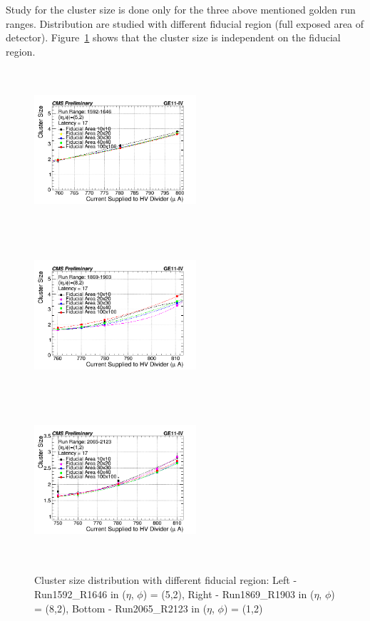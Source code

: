  Study for the cluster size is done only for the three above mentioned golden run ranges. Distribution are studied with different fiducial region (full exposed area of detector). Figure~\ref{fig:CSDfiducialregion} shows that the cluster size is independent on the fiducial region.
  \begin{figure}[!htbp]
    \begin{center}

      \includegraphics[width=6cm,height=6cm]{figures/GEM/CurrentvsClusterSizeR1592R1646.png}
      \includegraphics[width=6cm,height=6cm]{figures/GEM/CurrentvsClusterSizeR1869R1903.png}
      \includegraphics[width=6cm,height=6cm]{figures/GEM/CurrentvsClusterSizeR2065R2123.png}
    \end{center}
    \caption{Cluster size distribution with different fiducial region: Left - Run1592\_R1646 in ($\eta$, $\phi$) = (5,2), Right - Run1869\_R1903 in ($\eta$, $\phi$) = (8,2), Bottom - Run2065\_R2123 in ($\eta$, $\phi$) = (1,2)}
  \label{fig:CSDfiducialregion}
  \end{figure}

